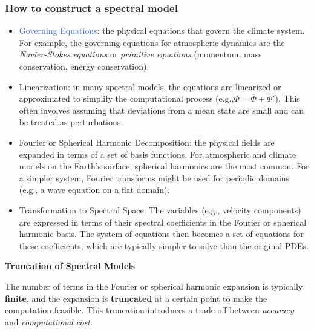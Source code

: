 \subsubsection{How to construct a spectral model}
\begin{itemize}
    \item \textcolor{RoyalBlue}{Governing Equations}: the physical equations that govern the climate system. For example, the governing equations for atmospheric dynamics are the \textit{Navier-Stokes equations} or \textit{primitive equations} (momentum, mass conservation, energy conservation).
    \item \textcolor{Sepia}{Linearization}: in many spectral models, the equations are linearized or approximated to simplify the computational process (e.g.,$\Phi=\overline{\Phi}+\Phi'$). This often involves assuming that deviations from a mean state are small and can be treated as perturbations.
    \item \textcolor{RoyalPurple}{Fourier or Spherical Harmonic Decomposition}: the physical fields are expanded in terms of a set of basis functions. For atmospheric and climate models on the Earth's surface, spherical harmonics are the most common. For a simpler system, Fourier transforms might be used for periodic domains (e.g., a wave equation on a flat domain).
    
    \item \textcolor{OliveGreen}{Transformation to Spectral Space}: The variables (e.g., velocity components) are expressed in terms of their spectral coefficients in the Fourier or spherical harmonic basis. The system of equations then becomes a set of equations for these coefficients, which are typically simpler to solve than the original PDEs.
\end{itemize}

\textbf{Truncation of Spectral Models}

The number of terms in the Fourier or spherical harmonic expansion is typically \textbf{finite}, and the expansion is \textbf{truncated} at a certain point to make the computation feasible. This truncation introduces a trade-off between \textit{accuracy} and \textit{computational cost}.

